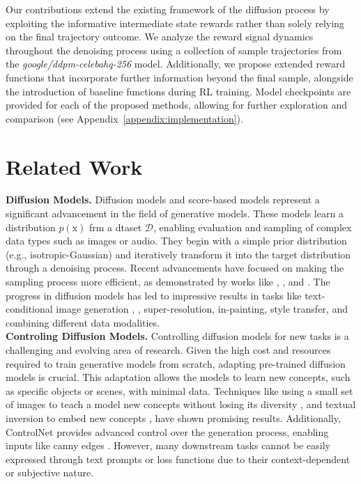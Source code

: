 \noindent Our contributions extend the existing framework of the diffusion process by exploiting the informative intermediate state rewards rather than solely relying on the final trajectory outcome. We analyze the reward signal dynamics throughout the denoising process using a collection of sample trajectories from the \textit{google/ddpm-celebahq-256} model. Additionally, we propose extended reward functions that incorporate further information beyond the final sample, alongside the introduction of baseline functions during RL training. Model checkpoints are provided for each of the proposed methods, allowing for further exploration and comparison (see Appendix~\ref{appendix:implementation}). \\


\section{Related Work}

\noindent\textbf{Diffusion Models.} Diffusion models and score-based models represent a significant advancement in the field of generative models. These models learn a distribution $p(\mathrm{x})$ frm a dtaset $\mathcal{D}$, enabling evaluation and sampling of complex data types such as images or audio. They begin with a simple prior distribution (e.g., isotropic-Gaussian) and iteratively transform it into the target distribution through a denoising process. Recent advancements have focused on making the sampling process more efficient, as demonstrated by works like \cite{song2020denoising}, \cite{nichol2021improved}, and \cite{Salimans2022ProgressiveDF}. The progress in diffusion models has led to impressive results in tasks like text-conditional image generation \cite{ramesh2022hierarchical}, \cite{saharia2022photorealistic}, super-resolution, in-painting, style transfer, and combining different data modalities. \\

\noindent\textbf{Controling Diffusion Models.} Controlling diffusion models for new tasks is a challenging and evolving area of research. Given the high cost and resources required to train generative models from scratch, adapting pre-trained diffusion models is crucial. This adaptation allows the models to learn new concepts, such as specific objects or scenes, with minimal data. Techniques like using a small set of images to teach a model new concepts without losing its diversity \cite{ruiz2023dreambooth}, and textual inversion to embed new concepts \cite{gal2022image}, have shown promising results. Additionally, ControlNet provides advanced control over the generation process, enabling inputs like canny edges \cite{zhang2023adding}. However, many downstream tasks cannot be easily expressed through text prompts or loss functions due to their context-dependent or subjective nature. \\

